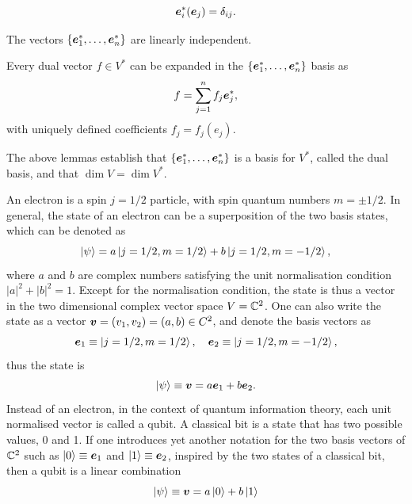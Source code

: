 \begin{equation}
    \bm{e}_i^*(\bm{e}_j) = \delta_{ij}.
\end{equation}
\begin{lem}
    The vectors $\{\bm{e}_1^*,\dots,\bm{e}_n^*\}$ are linearly independent.
\end{lem}
\begin{lem}
    Every dual vector $f \in V^*$ can be expanded in the $\{\bm{e}_1^*,\dots,\bm{e}_n^*\}$ basis as
    \begin{equation}
        f = \sum_{j=1}^nf_j\bm{e}^*_j,
    \end{equation}
    with uniquely defined coefficients $f_j = f_j(e_j)$.
\end{lem}
The above lemmas establish that $\{\bm{e}_1^*,\dots,\bm{e}_n^*\}$ is a basis for $V^*$, called the dual basis, and that $\dim{V} = \dim{V^*}$. 
\begin{ex}
    An electron is a spin $j = 1/2$ particle, with spin quantum numbers $m = \pm1/2$. In general, the state of an electron can be a superposition of the two basis states, which can be denoted as
    \begin{equation}
        \ket{\psi} = a\ket{j= 1/2, m = 1/2} + b\ket{j = 1/2, m = - 1/2},
    \end{equation}
    where $a$ and $b$ are complex numbers satisfying the unit normalisation condition $|a|^2 + |b|^2 = 1$. Except for the normalisation condition, the state is thus a vector in the two dimensional complex vector space $V = \mathbb{C}^2$. One can also write the state as a vector $\bm{v} = (v_1,v_2) = (a,b) \in C^2$, and denote the basis vectors as
    \begin{equation}
        \bm{e}_1 \equiv \ket{j= 1/2, m = 1/2},\quad \bm{e}_2 \equiv \ket{j= 1/2, m = -1/2},
    \end{equation}
    thus the state is 
    \begin{equation}
        \ket{\psi} \equiv \bm{v} = a\bm{e}_1 + b\bm{e}_2.
    \end{equation}
    Instead of an electron, in the context of quantum information theory, each unit normalised vector is called a qubit. A classical bit is a state that has two possible values, 0 and 1. If one introduces yet another notation for the two basis vectors of $\mathbb{C}^2$ such as $\ket{0} \equiv \bm{e}_1$ and $\ket{1} \equiv \bm{e}_2$, inspired by the two states of a classical bit, then a qubit is a linear combination 
    \begin{equation}
        \ket{\psi} \equiv \bm{v} = a\ket{0} + b\ket{1}
    \end{equation}

\end{ex}
